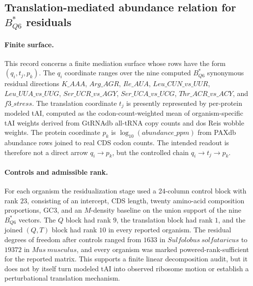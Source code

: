 \subsection{Translation-mediated abundance relation for $B^{\ast}_{Q6}$ residuals}\label{sec:q6-translation-mediated-protein-abundance-cross-layer}

\paragraph{Finite surface.}
This record concerns a finite mediation surface whose rows have the form $(q_i,t_j,p_k)$.  The $q_i$ coordinate ranges over the nine computed $B^{\ast}_{Q6}$ synonymous residual directions
$K\_AAA$, $Arg\_AGR$, $Ile\_AUA$, $Leu\_CUN\_vs\_UUR$, $Leu\_UUA\_vs\_UUG$, $Ser\_UCR\_vs\_AGY$, $Ser\_UCA\_vs\_UCG$, $Thr\_ACR\_vs\_ACY$, and $f3\_stress$.  The translation coordinate $t_j$ is presently represented by per-protein modeled tAI, computed as the codon-count-weighted mean of organism-specific tAI weights derived from GtRNAdb all-tRNA copy counts and dos Reis wobble weights.  The protein coordinate $p_k$ is $\log_{10}(abundance\_ppm)$ from PAXdb abundance rows joined to real CDS codon counts.  The intended readout is therefore not a direct arrow $q_i \to p_k$, but the controlled chain $q_i \to t_j \to p_k$.

\paragraph{Controls and admissible rank.}
For each organism the residualization stage used a 24-column control block with rank $23$, consisting of an intercept, CDS length, twenty amino-acid composition proportions, GC3, and an $M$-density baseline on the union support of the nine $B^{\ast}_{Q6}$ vectors.  The $Q$ block had rank $9$, the translation block had rank $1$, and the joined $(Q,T)$ block had rank $10$ in every reported organism.  The residual degrees of freedom after controls ranged from $1633$ in $Sulfolobus\ solfataricus$ to $19372$ in $Mus\ musculus$, and every organism was marked powered-rank-sufficient for the reported matrix.  This supports a finite linear decomposition audit, but it does not by itself turn modeled tAI into observed ribosome motion or establish a perturbational translation mechanism.

